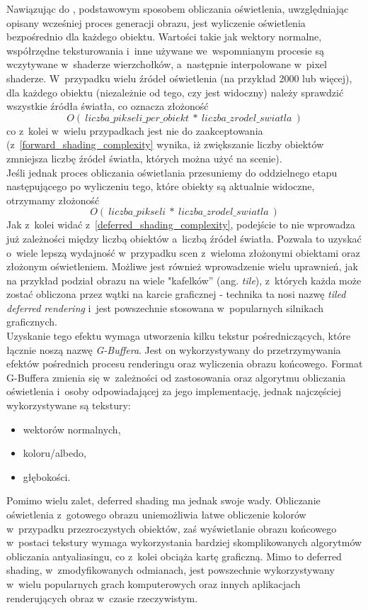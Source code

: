 Nawiązując do \cite{forward_deferred}, podstawowym sposobem obliczania oświetlenia, uwzględniając opisany wcześniej proces generacji obrazu, jest wyliczenie oświetlenia bezpośrednio dla każdego obiektu. Wartości takie jak wektory normalne, współrzędne teksturowania i~inne używane we~wspomnianym procesie są wczytywane w~shaderze wierzchołków, a~następnie interpolowane w~pixel shaderze. W~przypadku wielu źródeł oświetlenia (na przykład 2000 lub więcej), dla każdego obiektu (niezależnie od tego, czy jest widoczny) należy sprawdzić wszystkie źródła światła, co oznacza złożoność
\begin{equation}
\label{forward_shading_complexity}
O(~liczba\_pikseli\_per\_obiekt~*~liczba\_zrodel\_swiatla~)
\end{equation}
co z~kolei w~wielu przypadkach jest nie do zaakceptowania (z~\ref{forward_shading_complexity} wynika, iż zwiększanie liczby obiektów zmniejsza liczbę źródeł światła, których można użyć na scenie).\\
Jeśli jednak proces obliczania oświetlania przesuniemy do oddzielnego etapu następującego po wyliczeniu tego, które obiekty są aktualnie widoczne, otrzymamy złożoność
\begin{equation}
\label{deferred_shading_complexity}
O(~liczba\_pikseli~*~liczba\_zrodel\_swiatla~)
\end{equation}
Jak z~kolei widać z~\ref{deferred_shading_complexity}, podejście to nie wprowadza już zależności między liczbą obiektów a~liczbą źródeł światła. Pozwala to uzyskać o~wiele lepszą wydajność w~przypadku scen z~wieloma złożonymi obiektami oraz złożonym oświetleniem. Możliwe jest również wprowadzenie wielu uprawnień, jak na przykład podział obrazu na wiele "kafelków'' (ang. \emph{tile}), z~których każda może zostać obliczona przez wątki na karcie graficznej - technika ta nosi nazwę \emph{tiled deferred rendering} i~jest powszechnie stosowana w~popularnych silnikach graficznych.\\
Uzyskanie tego efektu wymaga utworzenia kilku tekstur pośredniczących, które łącznie noszą nazwę \emph{G-Buffera}. Jest on wykorzystywany do przetrzymywania efektów pośrednich procesu renderingu oraz wyliczenia obrazu końcowego. Format G-Buffera zmienia się w~zależności od zastosowania oraz algorytmu obliczania oświetlenia i~osoby odpowiadającej za jego implementację, jednak najczęściej wykorzystywane są tekstury:
\begin{itemize}
\item wektorów normalnych,
\item koloru/albedo,
\item głębokości.
\end{itemize}
Pomimo wielu zalet, deferred shading ma jednak swoje wady. Obliczanie oświetlenia z~gotowego obrazu uniemożliwia łatwe obliczenie kolorów w~przypadku przezroczystych obiektów, zaś wyświetlanie obrazu końcowego w~postaci tekstury wymaga wykorzystania bardziej skomplikowanych algorytmów obliczania antyaliasingu, co z~kolei obciąża kartę graficzną. Mimo to deferred shading, w~zmodyfikowanych odmianach, jest powszechnie wykorzystywany w~wielu popularnych grach komputerowych oraz innych aplikacjach renderujących obraz w~czasie rzeczywistym.

